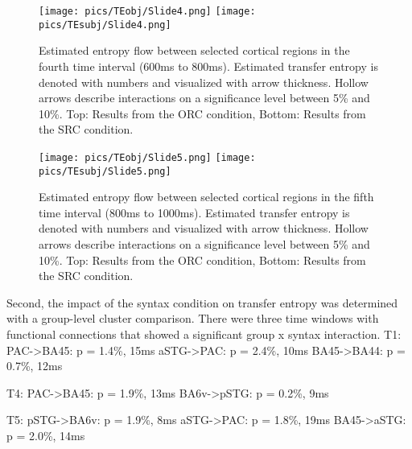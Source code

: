 \begin{figure}[h]
	\begin{center}
		\begin{minipage}{\textwidth}
			\texttt{[image: pics/TEobj/Slide4.png]}
			\texttt{[image: pics/TEsubj/Slide4.png]}
		\end{minipage}
	\caption{\label{4.4.networkgraph.d} Estimated entropy flow between selected cortical regions in the fourth time interval (600ms to 800ms). Estimated transfer entropy is denoted with numbers and visualized with arrow thickness. Hollow arrows describe interactions on a significance level between 5\% and 10\%. Top: Results from the ORC condition, Bottom: Results from the SRC condition.}
	\end{center}
\end{figure}
\vspace{5mm}

\begin{figure}[h]
	\begin{center}
		\begin{minipage}{\textwidth}
			\texttt{[image: pics/TEobj/Slide5.png]}
			\texttt{[image: pics/TEsubj/Slide5.png]}
		\end{minipage}
	\caption{\label{4.4.networkgraph.e} Estimated entropy flow between selected cortical regions in the fifth time interval (800ms to 1000ms). Estimated transfer entropy is denoted with numbers and visualized with arrow thickness. Hollow arrows describe interactions on a significance level between 5\% and 10\%. Top: Results from the ORC condition, Bottom: Results from the SRC condition.}
	\end{center}
\end{figure}
\vspace{5mm}

Second, the impact of the syntax condition on transfer entropy was determined with a group-level cluster comparison.
There were three time windows with functional connections that showed a significant group x syntax interaction.
T1:
PAC->BA45: p = 1.4\%, 15ms
aSTG->PAC: p = 2.4\%, 10ms
BA45->BA44: p = 0.7\%, 12ms

T4:
PAC->BA45: p = 1.9\%, 13ms
BA6v->pSTG: p = 0.2\%, 9ms

T5:
pSTG->BA6v: p = 1.9\%, 8ms
aSTG->PAC: p = 1.8\%, 19ms
BA45->aSTG: p = 2.0\%, 14ms
